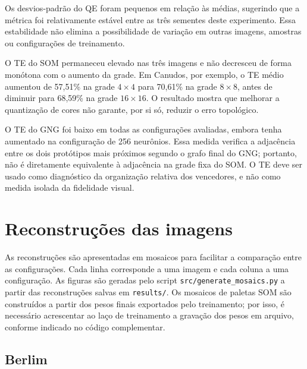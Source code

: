 \documentclass[11pt,a4paper]{article}
\begin{document}
Os desvios-padrão do QE foram pequenos em relação às médias, sugerindo que a
métrica foi relativamente estável entre as três sementes deste experimento.
Essa estabilidade não elimina a possibilidade de variação em outras imagens,
amostras ou configurações de treinamento.

O TE do SOM permaneceu elevado nas três imagens e não decresceu de forma
monótona com o aumento da grade. Em Canudos, por exemplo, o TE médio aumentou
de 57,51\% na grade \(4\times4\) para 70,61\% na grade \(8\times8\), antes de
diminuir para 68,59\% na grade \(16\times16\). O resultado mostra que melhorar
a quantização de cores não garante, por si só, reduzir o erro topológico.

O TE do GNG foi baixo em todas as configurações avaliadas, embora tenha
aumentado na configuração de 256 neurônios. Essa medida verifica a adjacência
entre os dois protótipos mais próximos segundo o grafo final do GNG; portanto,
não é diretamente equivalente à adjacência na grade fixa do SOM. O TE deve ser
usado como diagnóstico da organização relativa dos vencedores, e não como
medida isolada da fidelidade visual.

\section{Reconstruções das imagens}

As reconstruções são apresentadas em mosaicos para facilitar a comparação entre
as configurações. Cada linha corresponde a uma imagem e cada coluna a uma
configuração. As figuras são geradas pelo script
\texttt{src/generate\_mosaics.py} a partir das reconstruções salvas em
\texttt{results/}. Os mosaicos de paletas SOM são construídos a partir dos
pesos finais exportados pelo treinamento; por isso, é necessário acrescentar
ao laço de treinamento a gravação dos pesos em arquivo, conforme indicado no
código complementar.

\subsection{Berlim}
\end{document}
